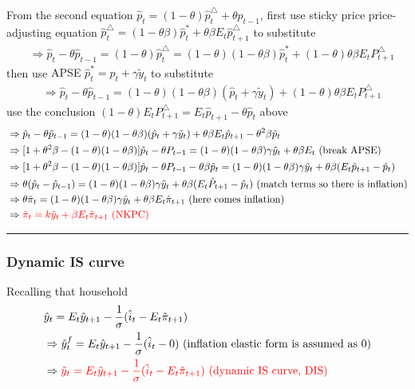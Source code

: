 \documentclass{article}
\newcommand*\sepline{%
  \begin{center}
    \rule[1ex]{.5\textwidth}{.5pt}
  \end{center}}
\begin{document}
From the second equation $\hat p_t=(1-\theta)\hat p_t^\triangle +\theta \hat p_{t-1}$, first use sticky price price-adjusting equation $\hat p_t^\triangle=(1-\theta \beta) \hat p_t^* +\theta \beta E_t \hat p_{t+1}^\triangle$ to substitute
\begin{align}
& \Rightarrow \hat p_t-\theta \hat p_{t-1}=(1-\theta)\hat p_t^\triangle = (1-\theta)(1-\theta \beta)\hat p_t^* 
+(1-\theta)\theta \beta E_t P^\triangle_{t+1}
\end{align}
then use {\color{red} APSE $\hat p_t^*=\hat p_t+\gamma \tilde y_t$} to substitute
\begin{align}
& \Rightarrow \hat p_t -\theta \hat p_{t-1}=(1-\theta)(1-\theta \beta)(\hat p_t+\gamma \tilde y_t)
+(1-\theta)\theta \beta E_t P^\triangle_{t+1}
\end{align}
use the conclusion $(1-\theta)E_t P_{t+1}^\triangle=E_t \hat p_{t+1} - \theta \hat p_t$ above
\begin{align}
& \Rightarrow \hat p_t -\theta \hat p_{t-1}=(1-\theta)(1-\theta \beta)(\hat p_t+\gamma \tilde y_t)+\theta \beta E_t \hat p_{t+1} -\theta^2 \beta \hat p_t
\\& \Rightarrow [1+\theta^2 \beta-(1-\theta)(1-\theta \beta)]\hat p_t -\theta P_{t-1}= (1-\theta)(1-\theta \beta) \gamma \tilde y_t +\theta \beta E_t \text{ (break APSE)}
\\& \Rightarrow 
[1+\theta^2 \beta-(1-\theta)(1-\theta \beta)]\hat p_t -\theta P_{t-1}-\theta \beta \hat p_t = (1-\theta)(1-\theta \beta)\gamma \tilde y_t +\theta \beta (E_t \hat p_{t+1}-\hat p_t)
\\& \Rightarrow 
\theta(\hat p_t -\hat p_{t-1})=(1-\theta)(1-\theta \beta)\gamma \tilde y_t +\theta \beta (E_t \hat P_{t+1}-\hat p_t) 
\text{ (match terms so there is inflation)}
\\& \Rightarrow 
\theta \hat \pi_t = (1-\theta )(1-\theta \beta)\gamma \tilde y_t +\theta \beta E_t \hat \pi_{t+1}
\text{ (here comes inflation)}
\\& \Rightarrow \color{red} \hat \pi_t=k \hat y_t+\beta E_t \hat \pi_{t+1} \text{ (NKPC)}
\end{align}



\sepline
\subsubsection{Dynamic IS curve}

Recalling that household
\begin{align}
& \hat y_t = E_t \hat y_{t+1} -\frac{1}{\sigma}(\hat i_t -E_t \hat \pi_{t+1})
\\& \Rightarrow \hat y_t^f= E_t \hat y_{t+1} -\frac{1}{\sigma}(\hat i_t -0)\text{ (inflation elastic form is assumed as $0$)}
\\& \Rightarrow \color{red} \tilde y_t=E_t \tilde y_{t+1} -\frac{1}{\sigma}(\hat i_t - E_t \hat \pi_{t+1})\text{ (dynamic IS curve, DIS)}
\end{align}
\end{document}
